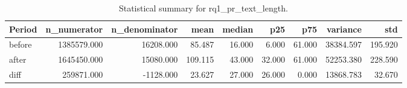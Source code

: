 \begin{table}[h]
\centering
\begin{tabular}{lrrrrrrrr}
\toprule
Period & n_numerator & n_denominator & mean & median & p25 & p75 & variance & std \\
\midrule
before & 1385579.000 & 16208.000 & 85.487 & 16.000 & 6.000 & 61.000 & 38384.597 & 195.920 \\
after & 1645450.000 & 15080.000 & 109.115 & 43.000 & 32.000 & 61.000 & 52253.380 & 228.590 \\
diff & 259871.000 & -1128.000 & 23.627 & 27.000 & 26.000 & 0.000 & 13868.783 & 32.670 \\
\bottomrule
\end{tabular}
\caption{Statistical summary for rq1_pr_text_length.}\label{tab:rq1_pr_text_length}
\end{table}
